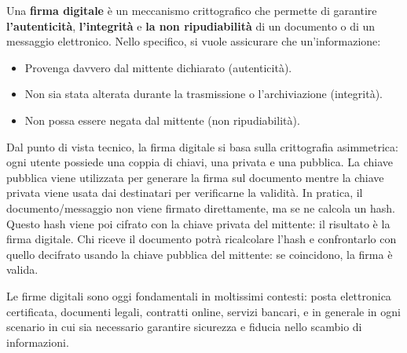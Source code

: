 Una \textbf{firma digitale} è un meccanismo crittografico che permette di garantire \textbf{l'autenticità}, \textbf{l'integrità} e \textbf{la non ripudiabilità} di un documento o di un messaggio elettronico. Nello specifico, si vuole assicurare che un'informazione:
\begin{itemize}
    \item Provenga davvero dal mittente dichiarato (autenticità).
    \item Non sia stata alterata durante la trasmissione o l'archiviazione (integrità).
    \item Non possa essere negata dal mittente (non ripudiabilità).
\end{itemize}

Dal punto di vista tecnico, la firma digitale si basa sulla crittografia asimmetrica: ogni utente possiede una coppia di chiavi, una privata e una pubblica. La chiave pubblica viene utilizzata per generare la firma sul documento mentre la chiave privata viene usata dai destinatari per verificarne la validità. In pratica, il documento/messaggio non viene firmato direttamente, ma se ne calcola un hash. Questo hash viene poi cifrato con la chiave privata del mittente: il risultato è la firma digitale. Chi riceve il documento potrà ricalcolare l'hash e confrontarlo con quello decifrato usando la chiave pubblica del mittente: se coincidono, la firma è valida.

Le firme digitali sono oggi fondamentali in moltissimi contesti: posta elettronica certificata, documenti legali, contratti online, servizi bancari, e in generale in ogni scenario in cui sia necessario garantire sicurezza e fiducia nello scambio di informazioni.

